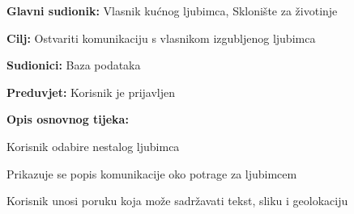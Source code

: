 					\pagebreak
					\noindent {}
					\begin{packed_item}
						
						\item \textbf{Glavni sudionik: }Vlasnik kućnog ljubimca, Sklonište za životinje
						\item  \textbf{Cilj:} Ostvariti komunikaciju s vlasnikom izgubljenog ljubimca
						\item  \textbf{Sudionici:} Baza podataka
						\item  \textbf{Preduvjet:} Korisnik je prijavljen
						\item  \textbf{Opis osnovnog tijeka:}
						
						\item[] \begin{packed_enum}
							
							\item Korisnik odabire nestalog ljubimca
							\item Prikazuje se popis komunikacije oko potrage za ljubimcem
							\item Korisnik unosi poruku koja može sadržavati tekst, sliku i geolokaciju
						\end{packed_enum}
					\end{packed_item}
					
